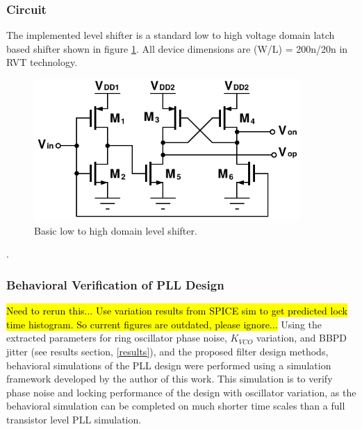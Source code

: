 		\subsubsection{Circuit}
			The implemented level shifter is a standard low to high voltage domain latch based shifter \cite{weste_harris_2011} shown in figure \ref{fig:level_shifter}. All device dimensions are (W/L) = 200n/20n in RVT technology.
			\begin{figure}[htb!]
			        \centering
			        \includegraphics[width=0.9\textwidth, angle=0]{./figs/design/level_shift}
			    \caption{Basic low to high domain level shifter.}
			    \label{fig:level_shifter}
			\end{figure}





{\color{white}.}

	\FloatBarrier

	\subsubsection{Behavioral Verification of PLL Design}
		\hl{Need to rerun this... Use variation results from SPICE sim to get predicted lock time histogram. So current figures are outdated, please ignore...}
		Using the extracted parameters for ring oscillator phase noise, $K_{VCO}$ variation, and BBPD jitter (see results section, \ref{results}), and the proposed filter design methods, behavioral simulations of the PLL design were performed using a simulation framework \cite{Me} developed by the author of this work. This simulation is to verify phase noise and locking performance of the design with oscillator variation, as the behavioral simulation can be completed on much shorter time scales than a full transistor level PLL simulation.

